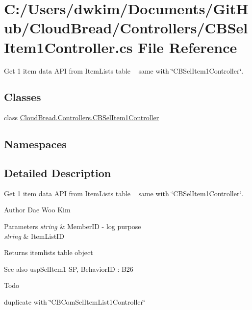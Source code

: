 \hypertarget{a00145}{}\section{C\+:/\+Users/dwkim/\+Documents/\+Git\+Hub/\+Cloud\+Bread/\+Controllers/\+C\+B\+Sel\+Item1\+Controller.cs File Reference}
\label{a00145}


Get 1 item data A\+PI from Item\+Lists table ~\newline
same with \char`\"{}\+C\+B\+Sel\+Item1\+Controller\char`\"{}.  


\subsection*{Classes}
\begin{DoxyCompactItemize}
\item 
class \hyperlink{a00033}{Cloud\+Bread.\+Controllers.\+C\+B\+Sel\+Item1\+Controller}
\end{DoxyCompactItemize}
\subsection*{Namespaces}
\begin{DoxyCompactItemize}
\end{DoxyCompactItemize}


\subsection{Detailed Description}
Get 1 item data A\+PI from Item\+Lists table ~\newline
same with \char`\"{}\+C\+B\+Sel\+Item1\+Controller\char`\"{}. 

\begin{DoxyAuthor}{Author}
Dae Woo Kim 
\end{DoxyAuthor}

\begin{DoxyParams}{Parameters}
{\em string} & Member\+ID -\/ log purpose \\
\hline
{\em string} & Item\+List\+ID \\
\hline
\end{DoxyParams}
\begin{DoxyReturn}{Returns}
itemlists table object 
\end{DoxyReturn}
\begin{DoxySeeAlso}{See also}
usp\+Sel\+Item1 SP, Behavior\+ID \+: B26 
\end{DoxySeeAlso}
\begin{DoxyRefDesc}{Todo}
\item[\hyperlink{a00001__todo000012}{Todo}]duplicate with \char`\"{}\+C\+B\+Com\+Sel\+Item\+List1\+Controller\char`\"{} \end{DoxyRefDesc}

